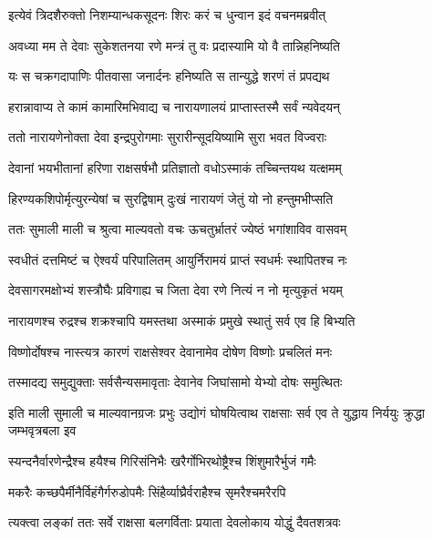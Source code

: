 \twolineshloka
{इत्येवं त्रिदशैरुक्तो निशम्यान्धकसूदनः}
{शिरः करं च धुन्वान इदं वचनमब्रवीत्} %

\twolineshloka
{अवध्या मम ते देवाः सुकेशतनया रणे}
{मन्त्रं तु वः प्रदास्यामि यो वै तान्निहनिष्यति} %

\twolineshloka
{यः स चक्रगदापाणिः पीतवासा जनार्दनः}
{हनिष्यति स तान्युद्धे शरणं तं प्रपद्यथ} %

\twolineshloka
{हरान्नावाप्य ते कामं कामारिमभिवाद्य च}
{नारायणालयं प्राप्तास्तस्मै सर्वं न्यवेदयन्} %

\twolineshloka
{ततो नारायणेनोक्ता देवा इन्द्रपुरोगमाः}
{सुरारीन्सूदयिष्यामि सुरा भवत विज्वराः} %

\twolineshloka
{देवानां भयभीतानां हरिणा राक्षसर्षभौ}
{प्रतिज्ञातो वधोऽस्माकं तच्चिन्तयथ यत्क्षमम्} %

\twolineshloka
{हिरण्यकशिपोर्मृत्युरन्येषां च सुरद्विषाम्}
{दुःखं नारायणं जेतुं यो नो हन्तुमभीप्सति} %

\twolineshloka
{ततः सुमाली माली च श्रुत्वा माल्यवतो वचः}
{ऊचतुर्भ्रातरं ज्येष्ठं भगांशाविव वासवम्} %

\twolineshloka
{स्वधीतं दत्तमिष्टं च ऐश्वर्यं परिपालितम्}
{आयुर्निरामयं प्राप्तं स्वधर्मः स्थापितश्च नः} %

\twolineshloka
{देवसागरमक्षोभ्यं शस्त्रौघैः प्रविगाह्य च}
{जिता देवा रणे नित्यं न नो मृत्युकृतं भयम्} %

\twolineshloka
{नारायणश्च रुद्रश्च शक्रश्चापि यमस्तथा}
{अस्माकं प्रमुखे स्थातुं सर्व एव हि बिभ्यति} %

\twolineshloka
{विष्णोर्दोषश्च नास्त्यत्र कारणं राक्षसेश्वर}
{देवानामेव दोषेण विष्णोः प्रचलितं मनः} %

\twolineshloka
{तस्मादद्य समुद्युक्ताः सर्वसैन्यसमावृताः}
{देवानेव जिघांसामो येभ्यो दोषः समुत्थितः} %

\threelineshloka
{इति माली सुमाली च माल्यवानग्रजः प्रभुः}
{उद्योगं घोषयित्वाथ राक्षसाः सर्व एव ते}
{युद्धाय निर्ययुः क्रुद्धा जम्भवृत्रबला इव} %

\twolineshloka
{स्यन्दनैर्वारणेन्द्रैश्च हयैश्च गिरिसंनिभैः}
{खरैर्गोभिरथोष्ट्रैश्च शिंशुमारैर्भुजं गमैः} %

\twolineshloka
{मकरैः कच्छपैर्मीनैर्विहंगैर्गरुडोपमैः}
{सिंहैर्व्याघ्रैर्वराहैश्च सृमरैश्चमरैरपि} %

\twolineshloka
{त्यक्त्वा लङ्कां ततः सर्वे राक्षसा बलगर्विताः}
{प्रयाता देवलोकाय योद्धुं दैवतशत्रवः} %

